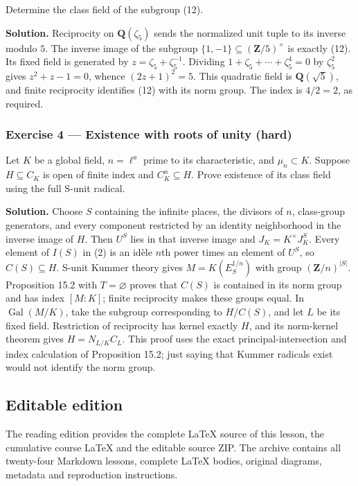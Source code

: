 \documentclass[11pt,a4paper]{article}
\begin{document}
Determine the class field of the subgroup (12).

\textbf{Solution.} Reciprocity on \(\mathbf Q(\zeta_5)\) sends the
normalized unit tuple to its inverse modulo \(5\). The inverse image of
the subgroup \(\{1,-1\}\subseteq(\mathbf Z/5)^\times\) is exactly (12).
Its fixed field is generated by \(z=\zeta_5+\zeta_5^{-1}\). Dividing
\(1+\zeta_5+\cdots+\zeta_5^4=0\) by \(\zeta_5^2\) gives \(z^2+z-1=0\),
whence \((2z+1)^2=5\). This quadratic field is \(\mathbf Q(\sqrt5)\),
and finite reciprocity identifies (12) with its norm group. The index is
\(4/2=2\), as required.

\subsubsection{Exercise 4 --- Existence with roots of unity
(hard)}\label{exercise-4-existence-with-roots-of-unity-hard}

Let \(K\) be a global field, \(n=\ell^a\) prime to its characteristic,
and \(\mu_n\subset K\). Suppose \(H\subseteq C_K\) is open of finite
index and \(C_K^n\subseteq H\). Prove existence of its class field using
the full S-unit radical.

\textbf{Solution.} Choose \(S\) containing the infinite places, the
divisors of \(n\), class-group generators, and every component
restricted by an identity neighborhood in the inverse image of \(H\).
Then \(U^S\) lies in that inverse image and \(J_K=K^\times J_K^S\).
Every element of \(I(S)\) in (2) is an idèle \(n\)th power times an
element of \(U^S\), so \(C(S)\subseteq H\). S-unit Kummer theory gives
\(M=K(E_S^{1/n})\) with group \((\mathbf Z/n)^{|S|}\). Proposition 15.2
with \(T=\varnothing\) proves that \(C(S)\) is contained in its norm
group and has index \([M:K]\); finite reciprocity makes these groups
equal. In \(\operatorname{Gal}(M/K)\), take the subgroup corresponding
to \(H/C(S)\), and let \(L\) be its fixed field. Restriction of
reciprocity has kernel exactly \(H\), and its norm-kernel theorem gives
\(H=N_{L/K}C_L\). This proof uses the exact principal-intersection and
index calculation of Proposition 15.2; just saying that Kummer radicals
exist would not identify the norm group.

\subsection{Editable edition}\label{editable-edition}

The reading edition provides the complete LaTeX source of this lesson,
the cumulative course LaTeX and the editable source ZIP. The archive
contains all twenty-four Markdown lessons, complete LaTeX bodies,
original diagrams, metadata and reproduction instructions.
\end{document}
